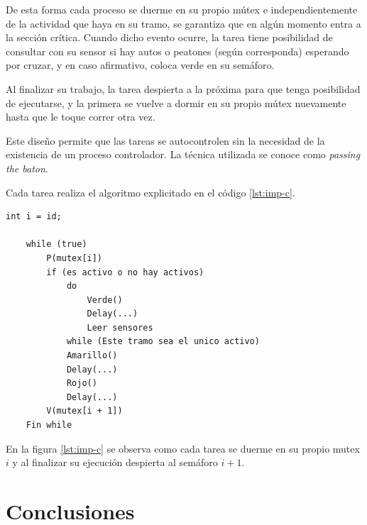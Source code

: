 De esta forma cada proceso se duerme en su propio mútex e independientemente de la actividad que haya en su tramo, se garantiza que en algún momento entra a la sección crítica.
Cuando dicho evento ocurre, la tarea tiene posibilidad de consultar con su sensor si hay autos o peatones (según corresponda) esperando por cruzar, y en caso afirmativo, coloca verde en su semáforo.

Al finalizar su trabajo, la tarea despierta a la próxima para que tenga posibilidad de ejecutarse, y la primera se vuelve a dormir en su propio mútex nuevamente hasta que le toque correr otra vez.

Este diseño permite que las tareas se autocontrolen sin la necesidad de la existencia de un proceso controlador.
La técnica utilizada se conoce como \emph{passing the baton}.

Cada tarea realiza el algoritmo explicitado en el código \ref{lst:imp-c}.

\begin{lstlisting}[float, label=lst:imp-c, caption=Pseudocódigo del programa que corre cada tarea en la implementación C.]
	int i = id;

	while (true)
		P(mutex[i])
		if (es activo o no hay activos)
			do
				Verde()
				Delay(...)
				Leer sensores
			while (Este tramo sea el unico activo)
			Amarillo()
			Delay(...)
			Rojo()
			Delay(...)
		V(mutex[i + 1])
	Fin while
\end{lstlisting}

En la figura \ref{lst:imp-c} se observa como cada tarea se duerme en su propio mutex $i$ y al finalizar su ejecución despierta al semáforo $i+1$.



\section{Conclusiones}\label{sec:conclusiones}

